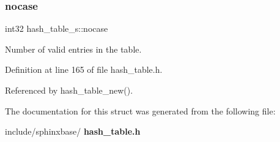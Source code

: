 \subsubsection{nocase}
{\footnotesize\ttfamily int32 hash\+\_\+table\+\_\+s\+::nocase}



Number of valid entries in the table. 



Definition at line 165 of file hash\+\_\+table.\+h.



Referenced by hash\+\_\+table\+\_\+new().



The documentation for this struct was generated from the following file\+:\begin{DoxyCompactItemize}
\item 
include/sphinxbase/\textbf{ hash\+\_\+table.\+h}\end{DoxyCompactItemize}
